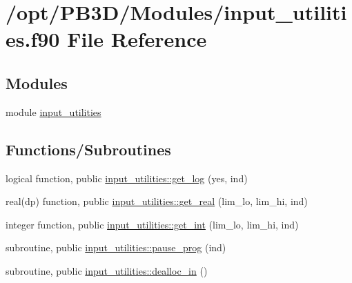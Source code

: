\hypertarget{input__utilities_8f90}{}\section{/opt/\+P\+B3\+D/\+Modules/input\+\_\+utilities.f90 File Reference}
\label{input__utilities_8f90}
\subsection*{Modules}
\begin{DoxyCompactItemize}
\item 
module \hyperlink{namespaceinput__utilities}{input\+\_\+utilities}
\end{DoxyCompactItemize}
\subsection*{Functions/\+Subroutines}
\begin{DoxyCompactItemize}
\item 
logical function, public \hyperlink{namespaceinput__utilities_ad9ce824c30b32041ab70f3fb191f06db}{input\+\_\+utilities\+::get\+\_\+log} (yes, ind)
\item 
real(dp) function, public \hyperlink{namespaceinput__utilities_a41fc0c806e12bc722771210cfa1edbd3}{input\+\_\+utilities\+::get\+\_\+real} (lim\+\_\+lo, lim\+\_\+hi, ind)
\item 
integer function, public \hyperlink{namespaceinput__utilities_a03e09af96ba6f7e187ea4a1d9b743148}{input\+\_\+utilities\+::get\+\_\+int} (lim\+\_\+lo, lim\+\_\+hi, ind)
\item 
subroutine, public \hyperlink{namespaceinput__utilities_a71bd36f063d55ab62c7a37864aef1185}{input\+\_\+utilities\+::pause\+\_\+prog} (ind)
\item 
subroutine, public \hyperlink{namespaceinput__utilities_aa0cf7578f9c9ab6470f8bb8d025f1daf}{input\+\_\+utilities\+::dealloc\+\_\+in} ()
\end{DoxyCompactItemize}
